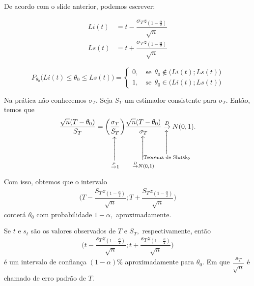 \documentclass[12pt]{beamer}
\begin{document}
\begin{frame}{}
\begin{block}{}
\justifying
De acordo com o slide anterior, podemos escrever:

\begin{align*}
    Li(t)&=t-\dfrac{\sigma_{T}z_{(1-\frac{\alpha}{2})}}{\sqrt{n}}\\
    Ls(t)&=t+\dfrac{\sigma_{T}z_{(1-\frac{\alpha}{2})}}{\sqrt{n}}
\end{align*}

$$
P_{\theta_{0}}\Big(Li(t)\leq \theta_{0}\leq Ls(t)\Big)=
\begin{cases}
0,\quad \text{se}~~\theta_{0}\notin \Big(Li(t);Ls(t)\Big)\\
1,\quad \text{se}~~\theta_{0} \in \Big(Li(t);Ls(t)\Big)
\end{cases}
$$
\end{block}
\end{frame}

\begin{frame}{}
\begin{block}{}
\justifying
Na prática não conhecemos $\sigma_{T}.$ Seja $S_{T}$ um estimador consistente para $\sigma_{T}.$ Então, temos que
\begin{align*}
    \dfrac{\sqrt{n}(T-\theta_{0})}{S_{T}}=\SetaUP{\ConvP 1}{\left(\dfrac{\sigma_{T}}{S_{T}}\right)}\SetaUP{\ConvD N(0,1)}{\dfrac{\sqrt{n}(T-\theta_{0})}{\sigma_{T}}}\SetaUP{\text{Teorema de Slutsky}}{\ConvD} N(0,1).
\end{align*}
\end{block}
\pause 
\begin{block}{}
\justifying
Com isso, obtemos que o intervalo 
\begin{align*}
    \Big(T-\dfrac{S_{T}z_{(1-\frac{\alpha}{2})}}{\sqrt{n}};T+\dfrac{S_{T}z_{(1-\frac{\alpha}{2})}}{\sqrt{n}}\Big)
\end{align*}
conterá $\theta_{0}$ com probabilidade $1-\alpha,$ aproximadamente.
\end{block}
\end{frame}

\begin{frame}{}
\begin{block}{}
\justifying
Se $t$ e $s_{t}$ são os valores observados de $T$ e $S_{T},$ respectivamente, então
\begin{align*}
    \Big(t-\dfrac{s_{T}z_{(1-\frac{\alpha}{2})}}{\sqrt{n}};t+\dfrac{s_{T}z_{(1-\frac{\alpha}{2})}}{\sqrt{n}}\Big)
\end{align*}
é um intervalo de confiança $(1-\alpha)\%$ aproximadamente para $\theta_{0}.$ Em que $\dfrac{s_{T}}{\sqrt{n}}$ é chamado de erro padrão de $T.$
\end{block}
\end{frame}
\end{document}
